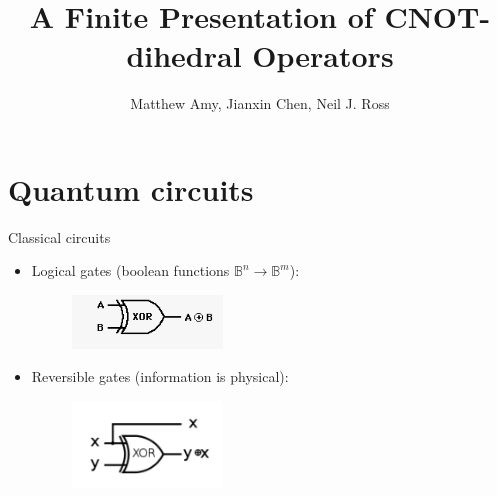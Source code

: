 \documentclass{beamer}
\theoremstyle{definition}
\newcommand{\changefont}[3]{\fontfamily{#1} \fontseries{#2} \fontshape{#3} \selectfont}
\begin{document}

\changefont{cmss}{m}{n}
\title{A Finite Presentation of CNOT-dihedral Operators}
\author{Matthew Amy, Jianxin Chen, Neil J. Ross}
\date{}
\frame{\titlepage}



\section{Quantum circuits}

\begin{frame}{Classical circuits}
	\begin{itemize}
		\item Logical gates (boolean functions $\mathbb{B}^n \rightarrow \mathbb{B}^m$):
		\begin{figure}
		\includegraphics[width=4cm]{images/IMG-XOR}
		\centering
		\end{figure}
		\item Reversible gates (information is physical):
		\begin{figure}
		\includegraphics[width=4cm]{images/IMG-revXOR}
		\centering
		\end{figure}
	\end{itemize}
\end{frame}
\end{document}

